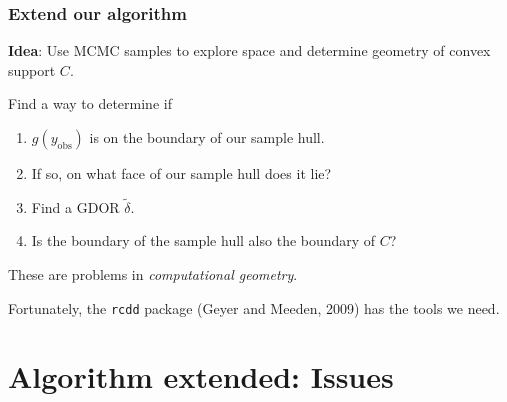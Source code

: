 \documentclass[ 10pt]{beamer}
\newcommand{\yobs}{y_{\text{obs}}}
\begin{document}
\frame
{
\frametitle{Extend our algorithm}  
\textbf{Idea}: Use MCMC samples to explore space and
determine geometry of convex support $C$.
%

\vspace{2mm}
\pause

Find a way to determine if
\begin{enumerate}
\item $g(\yobs)$ is on the boundary of our sample hull.
\item If so, on what face of our sample hull does it lie?
\item Find a GDOR $\tilde{\delta}$.
\item Is the boundary of the sample hull also the boundary of $C$?
\end{enumerate}

\vspace{2mm}
These are problems in \emph{computational geometry}.  

Fortunately, the \texttt{rcdd} package (Geyer and Meeden, 2009) has the 
tools we need.

}

\section{Algorithm extended: Issues}
\end{document}
